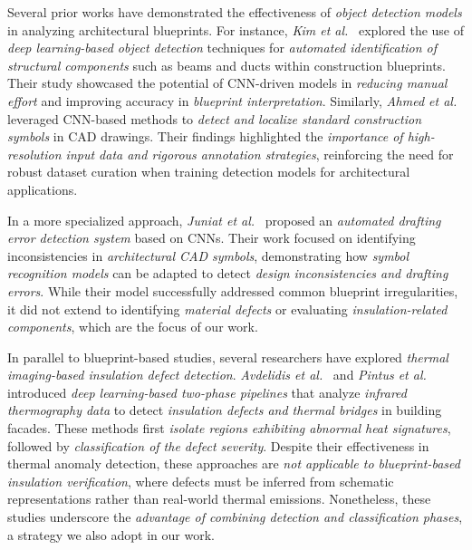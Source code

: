 \documentclass[]{IEEEphot}
\begin{document}
Several prior works have demonstrated the effectiveness of \textit{object detection models} in analyzing architectural blueprints. For instance, \textit{Kim et al.}~\cite{kim2020automated} explored the use of \textit{deep learning-based object detection} techniques for \textit{automated identification of structural components} such as beams and ducts within construction blueprints. Their study showcased the potential of CNN-driven models in \textit{reducing manual effort} and improving accuracy in \textit{blueprint interpretation}. Similarly, \textit{Ahmed et al.}~\cite{ahmed2020automatic} leveraged CNN-based methods to \textit{detect and localize standard construction symbols} in CAD drawings. Their findings highlighted the \textit{importance of high-resolution input data and rigorous annotation strategies}, reinforcing the need for robust dataset curation when training detection models for architectural applications.  

In a more specialized approach, \textit{Juniat et al.}~\cite{juniat2022automated} proposed an \textit{automated drafting error detection system} based on CNNs. Their work focused on identifying inconsistencies in \textit{architectural CAD symbols}, demonstrating how \textit{symbol recognition models} can be adapted to detect \textit{design inconsistencies and drafting errors}. While their model successfully addressed common blueprint irregularities, it did not extend to identifying \textit{material defects} or evaluating \textit{insulation-related components}, which are the focus of our work.  

In parallel to blueprint-based studies, several researchers have explored \textit{thermal imaging-based insulation defect detection}. \textit{Avdelidis et al.}~\cite{avdelidis2019infrared} and \textit{Pintus et al.}~\cite{pintus2021deep} introduced \textit{deep learning-based two-phase pipelines} that analyze \textit{infrared thermography data} to detect \textit{insulation defects and thermal bridges} in building facades. These methods first \textit{isolate regions exhibiting abnormal heat signatures}, followed by \textit{classification of the defect severity}. Despite their effectiveness in thermal anomaly detection, these approaches are \textit{not applicable to blueprint-based insulation verification}, where defects must be inferred from schematic representations rather than real-world thermal emissions. Nonetheless, these studies underscore the \textit{advantage of combining detection and classification phases}, a strategy we also adopt in our work.  
\end{document}
